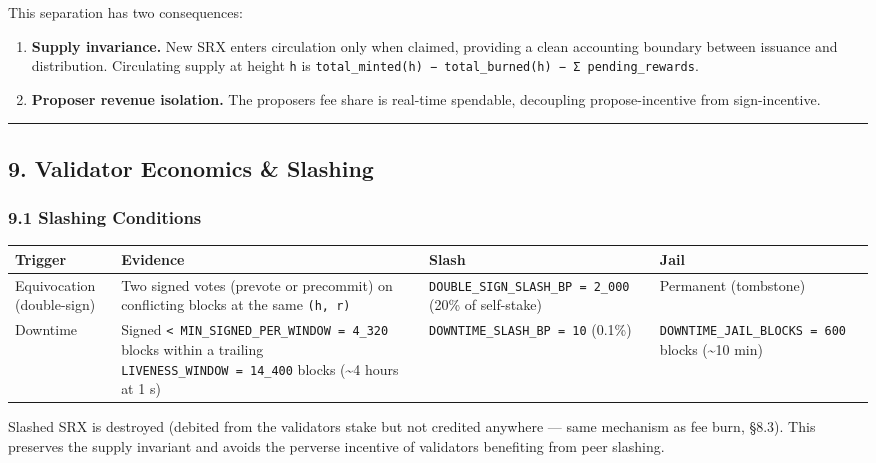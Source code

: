 \documentclass[11pt,a4paper]{article}
\providecommand{\tightlist}{\setlength{\itemsep}{0pt}\setlength{\parskip}{0pt}}
\begin{document}
This separation has two consequences:

\begin{enumerate}
\def\labelenumi{\arabic{enumi}.}
\tightlist
\item
  \textbf{Supply invariance.} New SRX enters circulation only when
  claimed, providing a clean accounting boundary between issuance and
  distribution. Circulating supply at height \texttt{h} is
  \texttt{total\_minted(h)\ −\ total\_burned(h)\ −\ Σ\ pending\_rewards}.
\item
  \textbf{Proposer revenue isolation.} The proposer\textquotesingle s
  fee share is real-time spendable, decoupling propose-incentive from
  sign-incentive.
\end{enumerate}

\begin{center}\rule{0.5\linewidth}{0.5pt}\end{center}

\hypertarget{9-validator-economics--slashing}{%
\subsection{9. Validator Economics \&
Slashing}\label{9-validator-economics--slashing}}

\hypertarget{91-slashing-conditions}{%
\subsubsection{9.1 Slashing Conditions}\label{91-slashing-conditions}}

\begin{longtable}[]{@{}llll@{}}
\toprule\noalign{}
Trigger & Evidence & Slash & Jail \\
\midrule\noalign{}
\endhead
\bottomrule\noalign{}
\endlastfoot
Equivocation (double-sign) & Two signed votes (prevote or precommit) on
conflicting blocks at the same \texttt{(h,\ r)} &
\texttt{DOUBLE\_SIGN\_SLASH\_BP\ =\ 2\_000} (20\% of self-stake) &
Permanent (tombstone) \\
Downtime & Signed
\texttt{\textless{}\ MIN\_SIGNED\_PER\_WINDOW\ =\ 4\_320} blocks within
a trailing \texttt{LIVENESS\_WINDOW\ =\ 14\_400} blocks
(\textasciitilde4 hours at 1 s) & \texttt{DOWNTIME\_SLASH\_BP\ =\ 10}
(0.1\%) & \texttt{DOWNTIME\_JAIL\_BLOCKS\ =\ 600} blocks
(\textasciitilde10 min) \\
\end{longtable}

Slashed SRX is destroyed (debited from the validator\textquotesingle s
stake but not credited anywhere --- same mechanism as fee burn, §8.3).
This preserves the supply invariant and avoids the perverse incentive of
validators benefiting from peer slashing.
\end{document}

